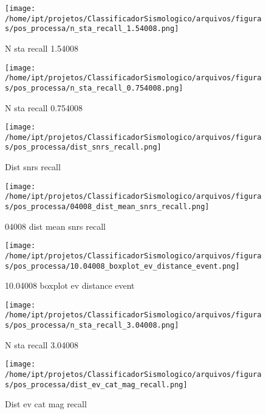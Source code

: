     \begin{figure}[H]
        \centering
        \texttt{[image: /home/ipt/projetos/ClassificadorSismologico/arquivos/figuras/pos\_processa/n\_sta\_recall\_1.54008.png]}
        \caption{N sta recall 1.54008}
        \label{fig:n_sta_recall_1.54008}
    \end{figure}
                

    \begin{figure}[H]
        \centering
        \texttt{[image: /home/ipt/projetos/ClassificadorSismologico/arquivos/figuras/pos\_processa/n\_sta\_recall\_0.754008.png]}
        \caption{N sta recall 0.754008}
        \label{fig:n_sta_recall_0.754008}
    \end{figure}
                

    \begin{figure}[H]
        \centering
        \texttt{[image: /home/ipt/projetos/ClassificadorSismologico/arquivos/figuras/pos\_processa/dist\_snrs\_recall.png]}
        \caption{Dist snrs recall}
        \label{fig:dist_snrs_recall}
    \end{figure}
                

    \begin{figure}[H]
        \centering
        \texttt{[image: /home/ipt/projetos/ClassificadorSismologico/arquivos/figuras/pos\_processa/04008\_dist\_mean\_snrs\_recall.png]}
        \caption{04008 dist mean snrs recall}
        \label{fig:04008_dist_mean_snrs_recall}
    \end{figure}
                

    \begin{figure}[H]
        \centering
        \texttt{[image: /home/ipt/projetos/ClassificadorSismologico/arquivos/figuras/pos\_processa/10.04008\_boxplot\_ev\_distance\_event.png]}
        \caption{10.04008 boxplot ev distance event}
        \label{fig:10.04008_boxplot_ev_distance_event}
    \end{figure}
                

    \begin{figure}[H]
        \centering
        \texttt{[image: /home/ipt/projetos/ClassificadorSismologico/arquivos/figuras/pos\_processa/n\_sta\_recall\_3.04008.png]}
        \caption{N sta recall 3.04008}
        \label{fig:n_sta_recall_3.04008}
    \end{figure}
                

    \begin{figure}[H]
        \centering
        \texttt{[image: /home/ipt/projetos/ClassificadorSismologico/arquivos/figuras/pos\_processa/dist\_ev\_cat\_mag\_recall.png]}
        \caption{Dist ev cat mag recall}
        \label{fig:dist_ev_cat_mag_recall}
    \end{figure}
                

